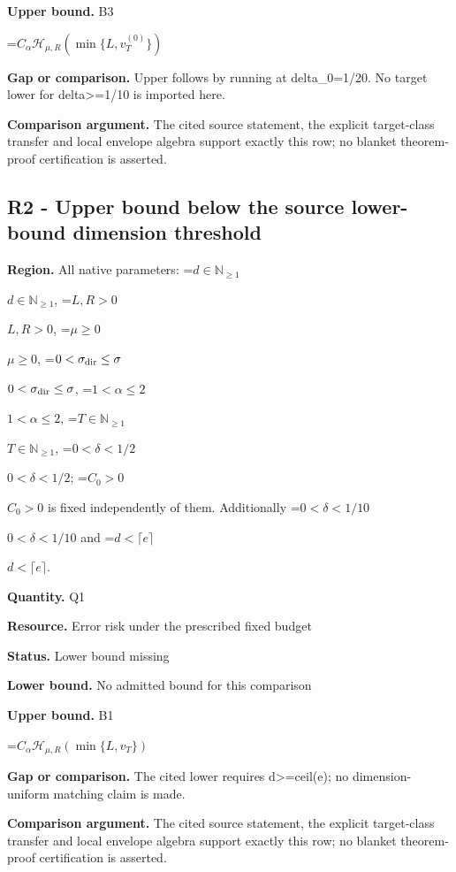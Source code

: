 \documentclass[10pt,a4paper]{article}
\newcommand{\AtlasMath}[1]{\par\begingroup\centering\setbox0=\hbox{$\displaystyle #1$}\ifdim\wd0>1.4\linewidth\typeout{ATLAS WIDE FORMULA: \the\wd0}\fi\ifdim\wd0>\linewidth\resizebox{\linewidth}{!}{\box0}\else\box0\fi\par\endgroup}
\newcommand{\AtlasInlineMath}[1]{\begingroup\setbox0=\hbox{$#1$}\ifdim\wd0>.4\linewidth\endgroup\AtlasMath{#1}\else\endgroup$#1$\fi}
\begin{document}
\textbf{Upper bound.} B3



\AtlasMath{C_\alpha\mathcal H_{\mu,R}(\min\{L,v_T^{(0)}\})}


\textbf{Gap or comparison.} Upper follows by running at delta\_0=1/20. No target lower for delta>=1/10 is imported here.



\textbf{Comparison argument.} The cited source statement, the explicit target-class transfer and local envelope algebra support exactly this row; no blanket theorem-proof certification is asserted.



\subsection{R2 - Upper bound below the source lower-bound dimension threshold}


\textbf{Region.} All native parameters: \AtlasInlineMath{d\in\mathbb N_{\ge1}}, \AtlasInlineMath{L,R>0}, \AtlasInlineMath{\mu\ge0}, \AtlasInlineMath{0<\sigma_{\rm dir}\le\sigma}, \AtlasInlineMath{1<\alpha\le2}, \AtlasInlineMath{T\in\mathbb N_{\ge1}}, \AtlasInlineMath{0<\delta<1/2}; \AtlasInlineMath{C_0>0} is fixed independently of them. Additionally \AtlasInlineMath{0<\delta<1/10} and \AtlasInlineMath{d<\lceil e\rceil}.



\textbf{Quantity.} Q1



\textbf{Resource.} Error risk under the prescribed fixed budget



\textbf{Status.} Lower bound missing



\textbf{Lower bound.} No admitted bound for this comparison



\textbf{Upper bound.} B1



\AtlasMath{C_\alpha\mathcal H_{\mu,R}(\min\{L,v_T\})}


\textbf{Gap or comparison.} The cited lower requires d>=ceil(e); no dimension-uniform matching claim is made.



\textbf{Comparison argument.} The cited source statement, the explicit target-class transfer and local envelope algebra support exactly this row; no blanket theorem-proof certification is asserted.
\end{document}
